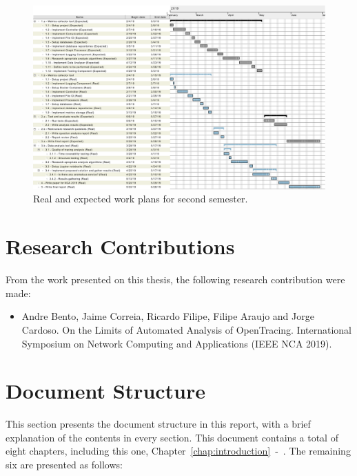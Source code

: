 \begin{landscape}
    \begin{figure}
        \includegraphics[height=1.0\textheight]{images/complete_work_plan_semester_2.pdf}
        \caption{Real and expected work plans for second semester.}
        \label{fig:complete_work_plan_semester_2}
    \end{figure}
\end{landscape}

\section{Research Contributions}
\label{sec:research_contributions}

From the work presented on this thesis, the following research contribution were made:

\begin{itemize}
    \item Andre Bento, Jaime Correia, Ricardo Filipe, Filipe Araujo and Jorge Cardoso. On the Limits of Automated Analysis of OpenTracing. International Symposium on Network Computing and Applications (IEEE NCA 2019). 
\end{itemize}

\section{Document Structure}
\label{sec:document_structure}

This section presents the document structure in this report, with a brief explanation of the contents in every section. This document contains a total of eight chapters, including this one, Chapter~\ref{chap:introduction}~-~. The remaining six are presented as follows:

